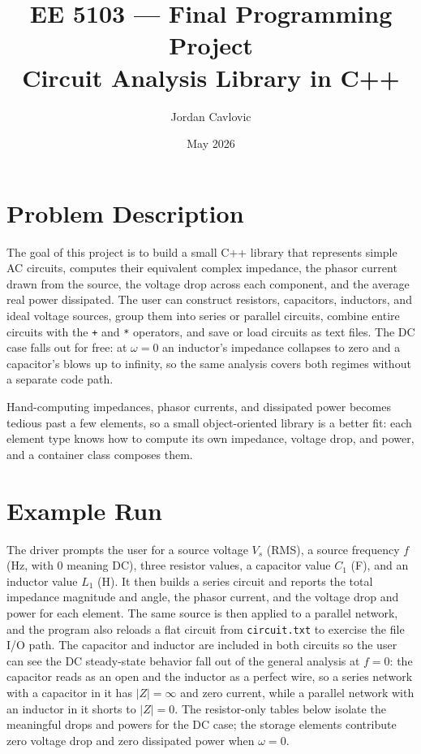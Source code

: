 \documentclass[11pt]{article}
\title{EE 5103 --- Final Programming Project\\
\large Circuit Analysis Library in C++}
\author{Jordan Cavlovic}
\date{May 2026}
\begin{document}
\maketitle

\section{Problem Description}

The goal of this project is to build a small C++ library that represents
simple AC circuits, computes their equivalent complex impedance, the
phasor current drawn from the source, the voltage drop across each
component, and the average real power dissipated. The user can construct
resistors, capacitors, inductors, and ideal voltage sources, group them
into series or parallel circuits, combine entire circuits with the
\texttt{+} and \texttt{*} operators, and save or load circuits as text
files. The DC case falls out for free: at $\omega = 0$ an inductor's
impedance collapses to zero and a capacitor's blows up to infinity, so
the same analysis covers both regimes without a separate code path.

Hand-computing impedances, phasor currents, and dissipated power becomes
tedious past a few elements, so a small object-oriented library is a
better fit: each element type knows how to compute its own impedance,
voltage drop, and power, and a container class composes them.

\section{Example Run}

The driver prompts the user for a source voltage $V_s$ (RMS), a source
frequency $f$ (Hz, with $0$ meaning DC), three resistor values, a
capacitor value $C_1$ (F), and an inductor value $L_1$ (H). It then
builds a series circuit and reports the total impedance magnitude and
angle, the phasor current, and the voltage drop and power for each
element. The same source is then applied to a parallel network, and the
program also reloads a flat circuit from \texttt{circuit.txt} to exercise
the file I/O path. The capacitor and inductor are included in both
circuits so the user can see the DC steady-state behavior fall out of
the general analysis at $f = 0$: the capacitor reads as an open and the
inductor as a perfect wire, so a series network with a capacitor in it
has $|Z| = \infty$ and zero current, while a parallel network with an
inductor in it shorts to $|Z| = 0$. The resistor-only tables below
isolate the meaningful drops and powers for the DC case; the storage
elements contribute zero voltage drop and zero dissipated power when
$\omega = 0$.
\end{document}
